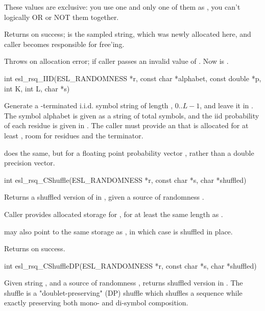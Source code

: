 \begin{sreapi}
These values are exclusive: you use one and only one of
them as , you can't logically OR or NOT
them together.

Returns  on success;  is the sampled string, which was
newly allocated here, and caller becomes responsible for free'ing.

Throws  on allocation error;  if caller 
passes an invalid value of . Now  
is .


\hypertarget{func:esl_rsq_IID()}
{\item[int esl\_rsq\_IID(ESL\_RANDOMNESS *r, const char *alphabet, const double *p, int K, int L, char *s)]}

Generate a -terminated i.i.d. symbol string of length ,
$0..L-1$, and leave it in . The symbol alphabet is given
as a string  of  total symbols, and the iid
probability of each residue is given in . The caller
must provide an  that is allocated for at least
, room for  residues and the  terminator.

 does the same, but for a floating point
probability vector , rather than a double precision
vector.



\hypertarget{func:esl_rsq_CShuffle()}
{\item[int esl\_rsq\_CShuffle(ESL\_RANDOMNESS *r, const char  *s, char *shuffled)]}

Returns a shuffled version of  in , given
a source of randomness .

Caller provides allocated storage for , for at
least the same length as .

 may also point to the same storage as ,
in which case  is shuffled in place.

Returns  on success.


\hypertarget{func:esl_rsq_CShuffleDP()}
{\item[int esl\_rsq\_CShuffleDP(ESL\_RANDOMNESS *r, const char *s, char *shuffled)]}

Given string , and a source of randomness ,
returns shuffled version in . The shuffle
is a "doublet-preserving" (DP) shuffle which
shuffles a sequence while exactly preserving both mono-
and di-symbol composition. 


\end{sreapi}
